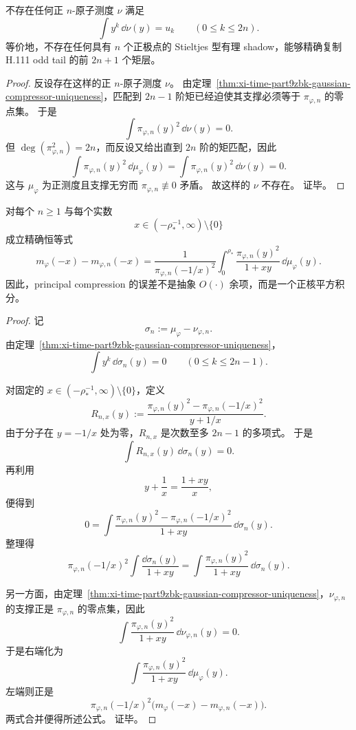 \begin{theorem}\label{thm:xi-time-part9zbk-positive-natomic-exactness-ceiling}
不存在任何正 \(n\)-原子测度 \(\nu\) 满足
\[
\int y^k\,\dd\nu(y)=u_k
\qquad (0\le k\le 2n).
\]
等价地，不存在任何具有 \(n\) 个正极点的 Stieltjes 型有理 shadow，能够精确复制 H.111 odd tail 的前 \(2n+1\) 个矩层。
\end{theorem}
\begin{proof}
反设存在这样的正 \(n\)-原子测度 \(\nu\)。
由定理~\ref{thm:xi-time-part9zbk-gaussian-compressor-uniqueness}，匹配到 \(2n-1\) 阶矩已经迫使其支撑必须等于 \(\pi_{\varphi,n}\) 的零点集。
于是
\[
\int \pi_{\varphi,n}(y)^2\,\dd\nu(y)=0.
\]
但 \(\deg(\pi_{\varphi,n}^2)=2n\)，而反设又给出直到 \(2n\) 阶的矩匹配，因此
\[
\int \pi_{\varphi,n}(y)^2\,\dd\mu_\varphi(y)
=
\int \pi_{\varphi,n}(y)^2\,\dd\nu(y)
=
0.
\]
这与 \(\mu_\varphi\) 为正测度且支撑无穷而 \(\pi_{\varphi,n}\not\equiv 0\) 矛盾。
故这样的 \(\nu\) 不存在。
证毕。
\end{proof}

\begin{theorem}\label{thm:xi-time-part9zbk-christoffel-gauss-square-remainder}
对每个 \(n\ge 1\) 与每个实数
\[
x\in(-\rho_\ast^{-1},\infty)\setminus\{0\}
\]
成立精确恒等式
\[
m_\varphi(-x)-m_{\varphi,n}(-x)
=
\frac{1}{\pi_{\varphi,n}(-1/x)^2}
\int_0^{\rho_\ast}
\frac{\pi_{\varphi,n}(y)^2}{1+xy}\,\dd\mu_\varphi(y).
\]
因此，principal compression 的误差不是抽象 \(O(\cdot)\) 余项，而是一个正核平方积分。
\end{theorem}
\begin{proof}
记
\[
\sigma_n:=\mu_\varphi-\nu_{\varphi,n}.
\]
由定理~\ref{thm:xi-time-part9zbk-gaussian-compressor-uniqueness}，
\[
\int y^k\,\dd\sigma_n(y)=0
\qquad (0\le k\le 2n-1).
\]

对固定的 \(x\in(-\rho_\ast^{-1},\infty)\setminus\{0\}\)，定义
\[
R_{n,x}(y)
:=
\frac{\pi_{\varphi,n}(y)^2-\pi_{\varphi,n}(-1/x)^2}{y+1/x}.
\]
由于分子在 \(y=-1/x\) 处为零，\(R_{n,x}\) 是次数至多 \(2n-1\) 的多项式。
于是
\[
\int R_{n,x}(y)\,\dd\sigma_n(y)=0.
\]
再利用
\[
y+\frac1x=\frac{1+xy}{x},
\]
便得到
\[
0=
\int
\frac{\pi_{\varphi,n}(y)^2-\pi_{\varphi,n}(-1/x)^2}{1+xy}
\,
\dd\sigma_n(y).
\]
整理得
\[
\pi_{\varphi,n}(-1/x)^2
\int\frac{\dd\sigma_n(y)}{1+xy}
=
\int\frac{\pi_{\varphi,n}(y)^2}{1+xy}\,\dd\sigma_n(y).
\]

另一方面，由定理~\ref{thm:xi-time-part9zbk-gaussian-compressor-uniqueness}，\(\nu_{\varphi,n}\) 的支撑正是 \(\pi_{\varphi,n}\) 的零点集，因此
\[
\int\frac{\pi_{\varphi,n}(y)^2}{1+xy}\,\dd\nu_{\varphi,n}(y)=0.
\]
于是右端化为
\[
\int\frac{\pi_{\varphi,n}(y)^2}{1+xy}\,\dd\mu_\varphi(y).
\]
左端则正是
\[
\pi_{\varphi,n}(-1/x)^2\bigl(m_\varphi(-x)-m_{\varphi,n}(-x)\bigr).
\]
两式合并便得所述公式。
证毕。
\end{proof}

